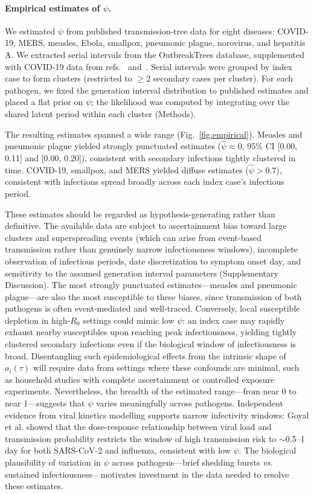 \documentclass[10pt]{article}
\makeatletter
\newcommand{\vs}{\textit{vs.}\@\xspace}
\makeatother
\begin{document}
\paragraph{Empirical estimates of $\psi$.}
We estimated $\psi$ from published transmission-tree data for eight diseases: COVID-19, MERS, measles, Ebola, smallpox, pneumonic plague, norovirus, and hepatitis A. We extracted serial intervals from the OutbreakTrees database\citep{taube_outbreaktrees_2022}, supplemented with COVID-19 data from refs.~ and~. Serial intervals were grouped by index case to form clusters (restricted to $\geq 2$ secondary cases per cluster). For each pathogen, we fixed the generation interval distribution to published estimates and placed a flat prior on $\psi$; the likelihood was computed by integrating over the shared latent period within each cluster (Methods).

The resulting estimates spanned a wide range (Fig.~\ref{fig:empirical}). Measles and pneumonic plague yielded strongly punctuated estimates ($\hat{\psi} \approx 0$, 95\% CI [0.00, 0.11] and [0.00, 0.20]), consistent with secondary infections tightly clustered in time. COVID-19, smallpox, and MERS yielded diffuse estimates ($\hat{\psi} > 0.7$), consistent with infections spread broadly across each index case's infectious period.

These estimates should be regarded as hypothesis-generating rather than definitive. The available data are subject to ascertainment bias toward large clusters and superspreading events (which can arise from event-based transmission rather than genuinely narrow infectiousness windows), incomplete observation of infectious periods, date discretization to symptom onset day, and sensitivity to the assumed generation interval parameters (Supplementary Discussion). The most strongly punctuated estimates---measles and pneumonic plague---are also the most susceptible to these biases, since transmission of both pathogens is often event-mediated and well-traced. Conversely, local susceptible depletion in high-$R_0$ settings could mimic low $\psi$: an index case may rapidly exhaust nearby susceptibles upon reaching peak infectiousness, yielding tightly clustered secondary infections even if the biological window of infectiousness is broad. Disentangling such epidemiological effects from the intrinsic shape of $a_i(\tau)$ will require data from settings where these confounds are minimal, such as household studies with complete ascertainment or controlled exposure experiments. Nevertheless, the breadth of the estimated range---from near 0 to near 1---suggests that $\psi$ varies meaningfully across pathogens. Independent evidence from viral kinetics modelling supports narrow infectivity windows: Goyal et al.\citep{goyal_viral_2021} showed that the dose-response relationship between viral load and transmission probability restricts the window of high transmission risk to $\sim$0.5--1 day for both SARS-CoV-2 and influenza, consistent with low $\psi$. The biological plausibility of variation in $\psi$ across pathogens---brief shedding bursts \vs sustained infectiousness---motivates investment in the data needed to resolve these estimates.
\end{document}
